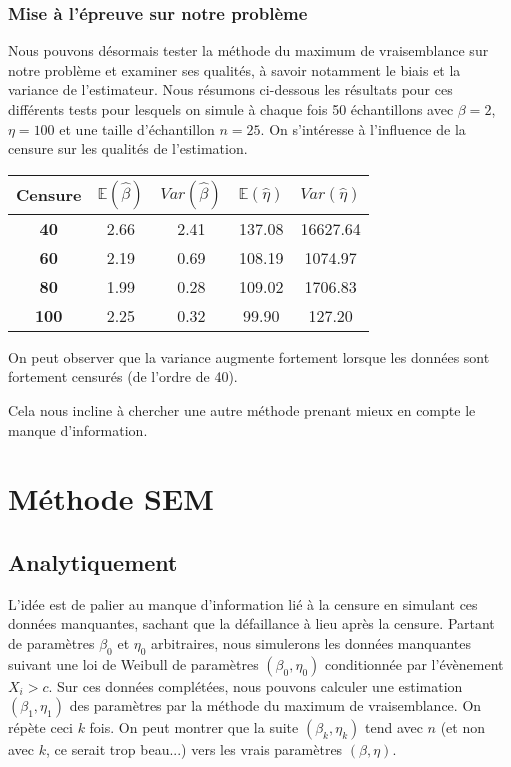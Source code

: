 \documentclass[a4paper]{report}
\begin{document}
\subsection{Mise à l'épreuve sur notre problème}

Nous pouvons désormais tester la méthode du maximum de vraisemblance sur notre problème et examiner ses qualités, à savoir notamment le biais et la variance de l'estimateur. Nous résumons ci-dessous les résultats pour ces différents tests pour lesquels on simule à chaque fois 50 échantillons avec $\beta=2$, $\eta=100$ et une taille d'échantillon $n=25$. On s'intéresse à l'influence de la censure sur les qualités de l'estimation.

\begin{center}
\begin{tabular}{|c||c|c||c|c|}
	\hline
	\bf Censure &  $\mathbb{E}(\hat{\beta})$  &  $Var(\hat{\beta})$ &  $\mathbb{E}(\hat{\eta})$ &  $Var(\hat{\eta})$ \\
	\hline
	\bf 40 &2.66 & 2.41 & 137.08 &16627.64 \\
	\hline
	\bf 60 &2.19 & 0.69 & 108.19 & 1074.97\\
	\hline
	\bf 80 &1.99 & 0.28 &109.02 &1706.83 \\
	\hline
	\bf 100 &2.25 &0.32  & 99.90&  127.20\\
	\hline
\end{tabular}
\end{center}

On peut observer que la variance augmente fortement lorsque les données sont fortement censurés (de l'ordre de 40).

Cela nous incline à chercher une autre méthode prenant mieux en compte le manque d'information. 

  \chapter {Méthode SEM}
  
  \section{Analytiquement}
  
  L'idée est de palier au manque d'information lié à la censure en simulant ces données manquantes, sachant que la défaillance à lieu après la censure. Partant de paramètres $\beta_0$ et $\eta_0$ arbitraires, nous simulerons les données manquantes suivant une loi de Weibull de paramètres $(\beta_0,\eta_0)$ conditionnée par l'évènement ${X_i >c}$. Sur ces données complétées, nous pouvons calculer une estimation $(\beta_1,\eta_1)$ des paramètres par la méthode du maximum de vraisemblance. On répète ceci $k$ fois. On peut montrer que la suite $(\beta_k, \eta_k)$ tend avec $n$ (et non avec $k$, ce serait trop beau...) vers les vrais paramètres $(\beta,\eta)$.
  
\end{document}
